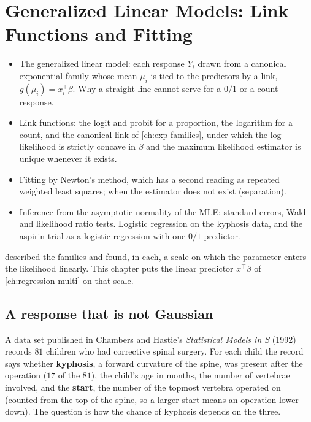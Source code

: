 \chapter[Link Functions and Fitting]{Generalized Linear Models: Link Functions and Fitting}
\label{ch:glm-links}

\begin{chaptergoals}
\begin{itemize}[nosep]
\item The generalized linear model: each response $Y_i$ drawn from a canonical exponential family whose mean $\mu_i$ is tied to the predictors by a link, $g(\mu_i) = x_i^\top\beta$. Why a straight line cannot serve for a $0/1$ or a count response.
\item Link functions: the logit and probit for a proportion, the logarithm for a count, and the canonical link of \cref{ch:exp-families}, under which the log-likelihood is strictly concave in $\beta$ and the maximum likelihood estimator is unique whenever it exists.
\item Fitting by Newton's method, which has a second reading as repeated weighted least squares; when the estimator does not exist (separation).
\item Inference from the asymptotic normality of the MLE: standard errors, Wald and likelihood ratio tests. Logistic regression on the kyphosis data, and the aspirin trial as a logistic regression with one $0/1$ predictor.
\end{itemize}
 described the families and found, in each, a scale on which the parameter enters the likelihood linearly. This chapter puts the linear predictor $x^\top\beta$ of \cref{ch:regression-multi} on that scale.
\end{chaptergoals}

\section{A response that is not Gaussian}
\label{sec:glm-model}

A data set published in Chambers and Hastie's \textit{Statistical Models in S} (1992) records $81$ children who had corrective spinal surgery.
For each child the record says whether \textbf{kyphosis}, a forward curvature of the spine, was present after the operation ($17$ of the $81$), the child's age in months, the number of vertebrae involved, and the \textbf{start}, the number of the topmost vertebra operated on (counted from the top of the spine, so a larger start means an operation lower down).
The question is how the chance of kyphosis depends on the three.

